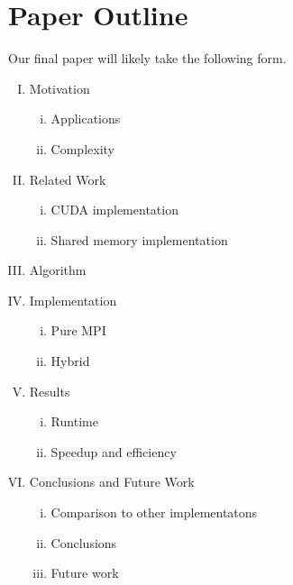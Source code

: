 \section{Paper Outline}

Our final paper will likely take the following form.

\begin{enumerate}[I.]
\item Motivation
\begin{enumerate}[i.]
\item Applications
\item Complexity
\end{enumerate}
\item Related Work
\begin{enumerate}[i.]
\item CUDA implementation
\item Shared memory implementation
\end{enumerate}
\item Algorithm
\item Implementation
\begin{enumerate}[i.]
\item Pure MPI
\item Hybrid
\end{enumerate}
\item Results
\begin{enumerate}[i.]
\item Runtime
\item Speedup and efficiency
\end{enumerate}
\item Conclusions and Future Work
\begin{enumerate}[i.]
\item Comparison to other implementatons
\item Conclusions
\item Future work
\end{enumerate}
\end{enumerate}

